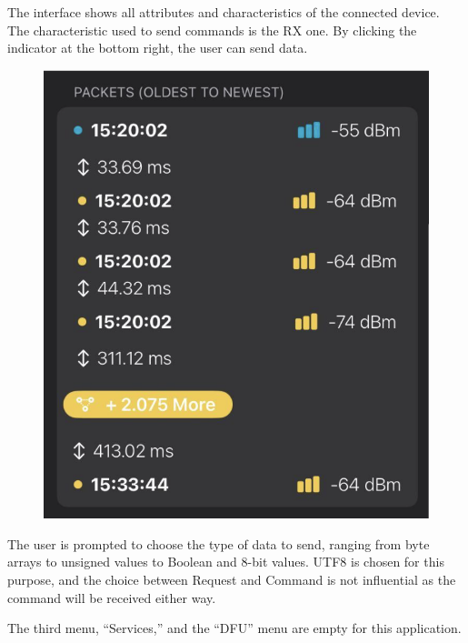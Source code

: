 \documentclass{Configuration_Files/PoliMi3i_thesis}
\begin{document}
The interface shows all attributes and characteristics of the connected device. The characteristic used to send commands is the RX one. By clicking the indicator at the bottom right, the user can send data.

\begin{figure}[H]
    \centering
    \includegraphics[scale=0.3]{Multicentral/10.png}
    \label{fig:nrf_connect_send_data}
\end{figure}

The user is prompted to choose the type of data to send, ranging from byte arrays to unsigned values to Boolean and 8-bit values. UTF8 is chosen for this purpose, and the choice between Request and Command is not influential as the command will be received either way.

The third menu, “Services,” and the “DFU” menu are empty for this application.
\end{document}
